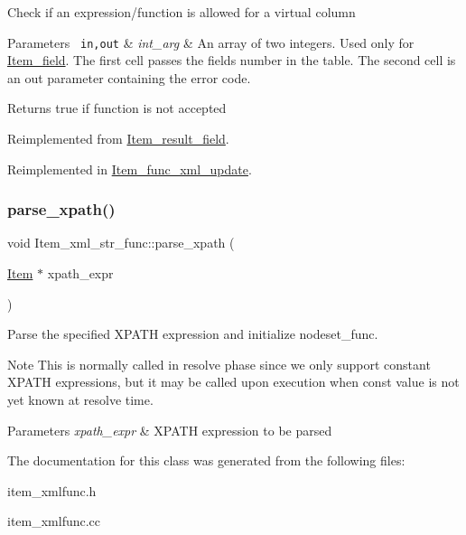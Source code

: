 Check if an expression/function is allowed for a virtual column


\begin{DoxyParams}[1]{Parameters}
\mbox{\texttt{ in,out}}  & {\em int\+\_\+arg} & An array of two integers. Used only for \mbox{\hyperlink{classItem__field}{Item\+\_\+field}}. The first cell passes the field\textquotesingle{}s number in the table. The second cell is an out parameter containing the error code.\\
\hline
\end{DoxyParams}
\begin{DoxyReturn}{Returns}
true if function is not accepted 
\end{DoxyReturn}


Reimplemented from \mbox{\hyperlink{classItem__result__field_a12324702e7f419b47de45e3505730441}{Item\+\_\+result\+\_\+field}}.



Reimplemented in \mbox{\hyperlink{classItem__func__xml__update_aef4d74587e25de0b32a863ecc3b27214}{Item\+\_\+func\+\_\+xml\+\_\+update}}.

\mbox{\label{classItem__xml__str__func_a7c2efc73a06fa01687872597b15fdff4}} 
\subsubsection{\texorpdfstring{parse\+\_\+xpath()}{parse\_xpath()}}
{\footnotesize\ttfamily void Item\+\_\+xml\+\_\+str\+\_\+func\+::parse\+\_\+xpath (\begin{DoxyParamCaption}\item[{\mbox{\hyperlink{classItem}{Item}} $\ast$}]{xpath\+\_\+expr }\end{DoxyParamCaption})\hspace{0.3cm}{\ttfamily [protected]}}

Parse the specified X\+P\+A\+TH expression and initialize {\ttfamily nodeset\+\_\+func}.

\begin{DoxyNote}{Note}
This is normally called in resolve phase since we only support constant X\+P\+A\+TH expressions, but it may be called upon execution when const value is not yet known at resolve time.
\end{DoxyNote}

\begin{DoxyParams}{Parameters}
{\em xpath\+\_\+expr} & X\+P\+A\+TH expression to be parsed \\
\hline
\end{DoxyParams}


The documentation for this class was generated from the following files\+:\begin{DoxyCompactItemize}
\item 
item\+\_\+xmlfunc.\+h\item 
item\+\_\+xmlfunc.\+cc\end{DoxyCompactItemize}
